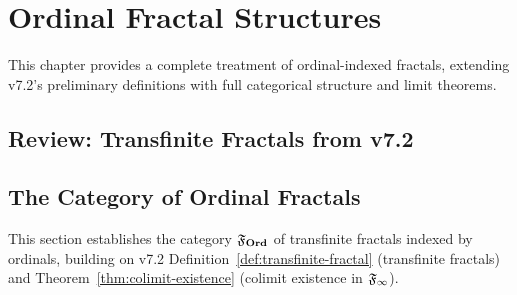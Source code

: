 
\chapter{Ordinal Fractal Structures}
\label{ch:ordinal-fractal-structures}

\begin{tcolorbox}[colback=blue!5!white,colframe=blue!75!black,title=\vnewthree]
This chapter provides a complete treatment of ordinal-indexed fractals, extending v7.2's preliminary definitions with full categorical structure and limit theorems.
\end{tcolorbox}

\section{Review: Transfinite Fractals from v7.2}
\label{sec:review-transfinite}

\section{The Category of Ordinal Fractals}
\label{sec:category-ord-frac}

\begin{tcolorbox}[colback=blue!5!white,colframe=blue!75!black,title=\vnewthree]
This section establishes the category $\mathfrak{F}_{\mathbf{Ord}}$ of transfinite fractals indexed by ordinals, building on v7.2 Definition~\ref*{def:transfinite-fractal} (transfinite fractals) and Theorem~\ref*{thm:colimit-existence} (colimit existence in $\mathfrak{F}_\infty$).
\end{tcolorbox}

